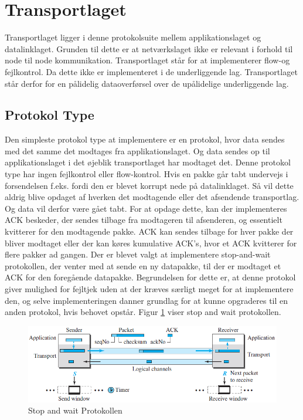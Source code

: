 \section{Transportlaget}
Transportlaget ligger i denne protokolsuite mellem applikationslaget og datalinklaget. Grunden til dette er at netværkslaget ikke er relevant i forhold til node til node kommunikation. Transportlaget står for at implementerer flow-og fejlkontrol. Da dette ikke er implementeret i de underliggende lag. Transportlaget står derfor for en pålidelig dataoverførsel over de upålidelige underliggende lag.

\subsection{Protokol Type}
Den simpleste protokol type at implementere er en protokol, hvor data sendes med det samme det modtages fra applikationslaget. Og data sendes op til applikationslaget i det øjeblik transportlaget har modtaget det. Denne protokol type har ingen fejlkontrol eller flow-kontrol. Hvis en pakke går tabt undervejs i forsendelsen f.eks. fordi den er blevet korrupt nede på datalinklaget. Så vil dette aldrig blive opdaget af hverken det modtagende eller det afsendende transportlag. Og data vil derfor være gået tabt. For at opdage dette, kan der implementeres ACK beskeder, der sendes tilbage fra modtageren til afsenderen, og essentielt kvitterer for den modtagende pakke. ACK kan sendes tilbage for hver pakke der bliver modtaget eller der kan køres kumulative ACK's, hvor et ACK kvitterer for flere pakker ad gangen. Der er blevet valgt at implementere stop-and-wait protokollen, der venter med at sende en ny datapakke, til der er modtaget et ACK for den foregående datapakke. Begrundelsen for dette er, at denne protokol giver mulighed for fejltjek uden at der kræves særligt meget for at implementere den, og selve implementeringen danner grundlag for at kunne opgraderes til en anden protokol, hvis behovet opstår. Figur \ref{StopAndWait} viser stop and wait protokollen.
\begin{figure}[h]
\centering
\includegraphics[scale=0.75]{Billeder/StopAndWait.png}
\caption{Stop and wait Protokollen
\label{StopAndWait}}
\end{figure}

